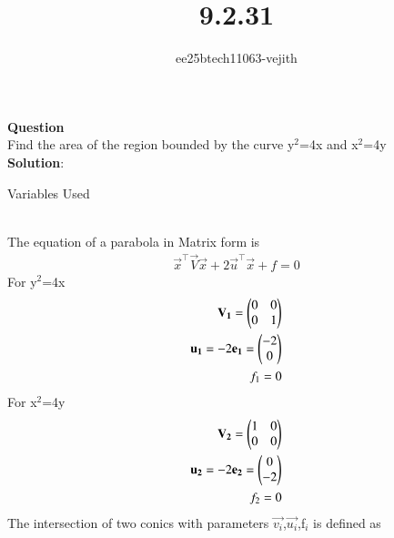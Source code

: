 \documentclass[journal]{IEEEtran}
\begin{document}

\vspace{3cm}

\title{9.2.31}
\author{ee25btech11063-vejith}

\maketitle
{\let\newpage\relax\maketitle}
\renewcommand{\thefigure}{\theenumi}
\renewcommand{\thetable}{\theenumi}
\setlength{\intextsep}{10pt} %
\textbf{Question}\\
Find the area of the region bounded by the curve y$^2$=4x and x$^2$=4y\\
\textbf{Solution}:\\
\begin{table}[h!]    
  \centering
  
  \caption{Variables Used}
  \label{}
\end{table}\\
The equation of a parabola in Matrix form is
\begin{align}
\vec{x}^\top\vec{V}\vec{x} + 2\vec{u}^\top\vec{x} + f = 0
\end{align}
For y$^2$=4x
\begin{align}
    \mathbf{V_1}=\begin{pmatrix}
        0 & 0\\
        0 & 1
    \end{pmatrix}\\
    \mathbf{u_1}=-2\mathbf{e_1}=\begin{pmatrix}-2\\0\end{pmatrix}\\
    f_1=0
\end{align}
For x$^2$=4y
\begin{align}
    \mathbf{V_2}=\begin{pmatrix}
        1 & 0\\
        0 & 0
    \end{pmatrix}\\
    \mathbf{u_2}=-2\mathbf{e_2}=\begin{pmatrix}0\\-2\end{pmatrix}\\
    f_2=0
\end{align}
The intersection of two conics with parameters $\vec{v_i}$,$\vec{u_i}$,f$_i$ is defined as 
\end{document}
